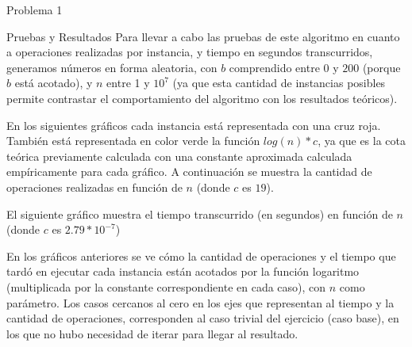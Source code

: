 \begin{section}{Problema 1}
\begin{subsection}{Pruebas y Resultados}
		Para llevar a cabo las pruebas de este algoritmo en cuanto a operaciones realizadas por instancia, y tiempo en segundos transcurridos, generamos números en forma aleatoria, con $b$ comprendido entre $0$ y $200$ (porque $b$ está acotado), y $n$ entre 1 y $10^7$ (ya que esta cantidad de instancias posibles permite contrastar el comportamiento del algoritmo con los resultados teóricos).

En los siguientes gráficos cada instancia está representada con una cruz roja. También está representada en color verde la función $log(n)*c$, ya que es la cota teórica previamente calculada con una constante aproximada calculada empíricamente para cada gráfico. A continuación se muestra la cantidad de operaciones realizadas en función de $n$ (donde $c$ es $19$).\VSP

		\VSP
		
		\newpage

El siguiente gráfico muestra el tiempo transcurrido (en segundos) en función de $n$ (donde $c$ es $2.79*10^{-7}$)\VSP


En los gráficos anteriores se ve cómo la cantidad de operaciones y el tiempo que tardó en ejecutar cada instancia están acotados por la función logaritmo (multiplicada por la constante correspondiente en cada caso), con $n$ como parámetro. Los casos cercanos al cero en los ejes que representan al tiempo y la cantidad de operaciones, co\-rres\-pon\-den al caso trivial del ejercicio (caso base), en los que no hubo necesidad de iterar para llegar al resultado.\Pa


\end{subsection}
\end{section}
